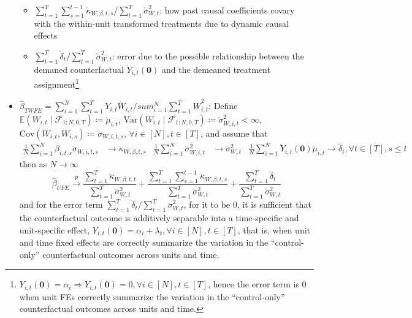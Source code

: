 \documentclass[twoside]{article}
\begin{document}
\begin{itemize}
\begin{itemize}
        \item ${\sum^T_{t=1}\sum^{t-1}_{s=1}\mathring{\kappa}_{W,\beta,t,s}}/{\sum^T_{t=1}\mathring{\sigma}^2_{W,t}}$: how past causal coefficients covary with the within-unit transformed treatments due to dynamic causal effects
        \item ${\sum^T_{t=1}\mathring{\delta}_t}/{\sum^T_{t=1}\mathring{\sigma}^2_{W,t}}$: error due to the possible relationship between the demaned counterfactual $\ddot{Y}_{i,t}(\mathbf{0})$ and the demeaned treatment assignment\footnote{$Y_{i,t}(\mathbf{0})=\alpha_i \Rightarrow \ddot{Y}_{i,t}(\mathbf{0})=0,\forall i\in [N],t\in[T] $, hence the error term is 0 when unit FEs correctly summarize the variation in the ``control-only'' counterfactual outcomes across units and time.}
    \end{itemize}
    \item {} $\hat{\beta}_{TWFE}=\sum^N_{i=1}\sum^T_{t=1}\ddot{Y}_{i,t}\ddot{W}_{i,t}/sum^N_{i=1}\sum^T_{t=1}\ddot{W}^2_{i,t}$: Define $\mathbb{E}(\ddot{W}_{i,t}\mid \mathcal{F}_{1:N,0,T} )\coloneq \ddot{\mu}_{i,t}$, $\mathrm{Var}(\ddot{W}_{i,t}\mid\mathcal{F}_{1:N,0,T})\coloneq \ddot{\sigma}^2_{W,i,t}<\infty$, $\mathrm{Cov}(\ddot{W}_{i,t},\ddot{W}_{i,s})\coloneq \ddot{\sigma}_{W,i,t,s}$, $\forall i\in [N],t\in[T]$, and assume that
    \begin{align*}
        \frac{1}{N}\sum^N_{i=1}\beta_{i,t,s}\ddot{\sigma}_{W,i,t,s} &\rightarrow \ddot{\kappa}_{W,\beta,t,s} & \frac{1}{N}\sum^N_{i=1}\ddot{\sigma}^2_{W,i,t} &\rightarrow\ddot{\sigma}^2_{W,t} & \frac{1}{N}\sum^N_{i=1}\ddot{Y}_{i,t}(\mathbf{0})\ddot{\mu}_{i,t}\rightarrow \ddot{\delta}_t, \forall t\in [T], s\leq t
    \end{align*}
    then as $N\rightarrow\infty$
    \begin{equation*}
        \hat{\beta}_{UFE}\xrightarrow{p} \frac{\sum^T_{t=1}\ddot{\kappa}_{W,\beta,t,t}}{\sum^T_{t=1}\ddot{\sigma}^2_{W,t}} + \frac{\sum^T_{t=1}\sum^{t-1}_{s=1}\ddot{\kappa}_{W,\beta,t,s}}{\sum^T_{t=1}\ddot{\sigma}^2_{W,t}} + \frac{\sum^T_{t=1}\ddot{\delta}_t}{\sum^T_{t=1}\ddot{\sigma}^2_{W,t}}
    \end{equation*}
    and for the error term $\sum^T_{t=1}\ddot{\delta}_t/\sum^T_{t=1}\ddot{\sigma}^2_{W,t}$, for it to be 0, it is sufficient that the counterfactual outcome is additively separable into a time-specific and unit-specific effect, $Y_{i,t}(\mathbf{0})=\alpha_i+\lambda_t,\forall i\in[N],t\in[T]$, that is, when unit and time fixed effects are correctly summarize the variation in the ``control-only'' counterfactual outcomes across units and time.
\end{itemize}
\end{document}
